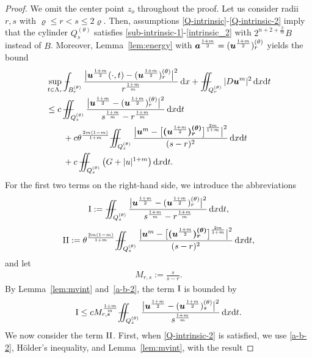 \documentclass[a4paper, 10pt, american]{amsart}
\numberwithin{theorem}{section}
\numberwithin{equation}{section}
\newcommand{\dxdt}{\,\mathrm{d}x\mathrm{d}t}
\newcommand{\dx}{\,\mathrm{d}x}
\renewcommand{\rho}{\varrho}
\newcommand{\power}[2]{\bm{#1^{\mbox{\unboldmath{\scriptsize$#2$}}}}}
\def\Xint#1{\mathchoice
    {\XXint\displaystyle\textstyle{#1}}%
    {\XXint\textstyle\scriptstyle{#1}}%
    {\XXint\scriptstyle\scriptscriptstyle{#1}}%
    {\XXint\scriptscriptstyle\scriptscriptstyle{#1}}%
    \!\int}
\def\XXint#1#2#3{\setbox0=\hbox{$#1{#2#3}{\int}$}
    \vcenter{\hbox{$#2#3$}}\kern-0.5\wd0}
\def\bint{\Xint-}
\def\Xiint#1{\mathchoice
    {\XXiint\displaystyle\textstyle{#1}}%
    {\XXiint\textstyle\scriptstyle{#1}}%
    {\XXiint\scriptstyle\scriptscriptstyle{#1}}%
    {\XXiint\scriptscriptstyle\scriptscriptstyle{#1}}%
    \!\iint}
\def\XXiint#1#2#3{\setbox0=\hbox{$#1{#2#3}{\iint}$}
    \vcenter{\hbox{$#2#3$}}\kern-0.5\wd0}
\def\biint{\Xiint{-\!-}}
\begin{document}
\begin{proof}
We omit the center point $z_o$ throughout the proof. 
Let us consider radii $r,s$ with $\rho\le r<s\le2\rho$.
Then, assumptions \eqref{Q-intrinsic}-\eqref{Q-intrinsic-2} imply that
the cylinder $Q_s^{(\theta)}$ satisfies
\eqref{sub-intrinsic-1}-\eqref{intrinsic_2} with $2^{n+2+\frac2m}B$
instead of $B$. Moreover, Lemma~\ref{lem:energy} with $\power
a{\frac{1+m}2}=(\power u{\frac{1+m}2})_r^{(\theta)}$ yields the bound
\begin{align}\label{i-ii-iii}
\nonumber
&\sup_{t\in\Lambda_r}\bint_{B_r^{(\theta)}}\frac{\big|\power u{\frac{1+m}2}(\cdot,t)-(\power u{\frac{1+m}2})_r^{(\theta)}\big|^2}{r^\frac{1+m}m}\dx
+
\biint_{Q_r^{(\theta)}}|D\power um|^2\dxdt\\\nonumber
&\le
c\,\biint_{Q_s^{(\theta)}}\frac{\big|\power u{\frac{1+m}2}-(\power u{\frac{1+m}2})_r^{(\theta)}\big|^2}{s^\frac{1+m}m-r^\frac{1+m}m}\dxdt\\\nonumber
&\qquad+
c\theta^{\frac{2m(1-m)}{1+m}}\biint_{Q_s^{(\theta)}}\frac{\big|\power um-
\power{\big[( \power u{\frac{1+m}2})_r^{(\theta)}\big]}{\frac{2m}{1+m}} \big|^2}{(s-r)^2}\dxdt\\
&\qquad+
c\,\biint_{Q_s^{(\theta)}}\big(G+|u|^{1+m}\big)\dxdt.
\end{align}
For the first two terms on the right-hand side, we introduce the
abbreviations 
\begin{align*}
{\rm{I}}
:=\biint_{Q_s^{(\theta)}}\frac{\big|\power u{\frac{1+m}2}-(\power u{\frac{1+m}2})_r^{(\theta)}\big|^2}{s^\frac{1+m}m-r^\frac{1+m}m}\dxdt,
\end{align*}
\begin{align*}
{\rm{II}}
:=\theta^{\frac{2m(1-m)}{1+m}}\biint_{Q_s^{(\theta)}}\frac{\big|\power um-
\power{\big[( \power u{\frac{1+m}2})_r^{(\theta)}\big]}{\frac{2m}{1+m}} \big|^2}{(s-r)^2}\dxdt,
\end{align*}
and let
\begin{align*}
M_{r,s}:=\frac{s}{s-r}.
\end{align*}
By Lemma~\ref{lem:mvint} and~\eqref{a-b-2},
the term $\rm{I}$ is bounded by
\begin{align}\label{est-i}
{\rm{I}}
\le
cM_{r,s}^\frac{1+m}m\biint_{Q_s^{(\theta)}}\frac{\big|\power u{\frac{1+m}2}-(\power u{\frac{1+m}2})_s^{(\theta)}\big|^2}{s^\frac{1+m}m}\dxdt.
\end{align}
We now consider the term $\rm{II}$. First, when \eqref{Q-intrinsic-2}
is satisfied, we use \eqref{a-b-2}, H\"older's inequality, and
Lemma~\ref{lem:mvint}, with the result

\end{proof}
\end{document}
